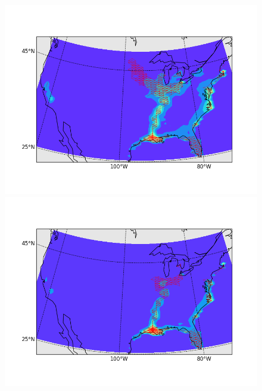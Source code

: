 \documentclass{article} %
\begin{document}
\begin{figure}
\includegraphics[width =.5 \textwidth ]{../code/swallowpics/bird36.png}
\includegraphics[width =.5 \textwidth ]{../code/swallowpics/bird38.png} \vspace{-20pt}
\end{figure} 




\end{document}
